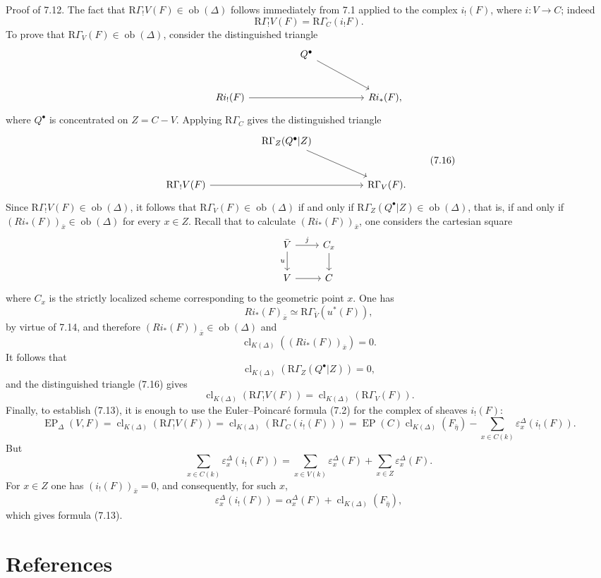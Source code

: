 \documentclass[11pt]{article}
\providecommand{\EP}{\operatorname{EP}}
\providecommand{\Ob}{\operatorname{ob}}
\providecommand{\Ob}{\operatorname{ob}}
\providecommand{\EP}{\operatorname{EP}}
\providecommand{\Ob}{\operatorname{Ob}}
\providecommand{\clK}[1]{\operatorname{cl}_{K(#1)}}
\providecommand{\RG}{\mathrm R\Gamma}
\begin{document}
Proof of 7.12. The fact that $\RG_!V(F)\in\Ob(\Delta)$ follows immediately from 7.1 applied to the complex $i_!(F)$, where $i:V\to C$; indeed
\[
\RG_!V(F)=\RG_C(i_!F).
\]
To prove that $\RG_V(F)\in\Ob(\Delta)$, consider the distinguished triangle
\[
\begin{tikzcd}[column sep=huge,row sep=large]
& Q^\bullet \arrow[dr] &\\
Ri_!(F) \arrow[rr] && Ri_*(F),
\end{tikzcd}
\]
where $Q^\bullet$ is concentrated on $Z=C-V$. Applying $\RG_C$ gives the distinguished triangle
\[
\begin{tikzcd}[column sep=huge,row sep=large]
& \RG_Z(Q^\bullet|Z) \arrow[dr] &\\
\RG_!V(F) \arrow[rr] && \RG_V(F).
\end{tikzcd}
\tag{7.16}
\]
Since $\RG_!V(F)\in\Ob(\Delta)$, it follows that $\RG_V(F)\in\Ob(\Delta)$ if and only if $\RG_Z(Q^\bullet|Z)\in\Ob(\Delta)$, that is, if and only if $(Ri_*(F))_{\bar x}\in\Ob(\Delta)$ for every $x\in Z$. Recall that to calculate $(Ri_*(F))_{\bar x}$, one considers the cartesian square
\[
\begin{tikzcd}
\bar V \arrow[r,"j"] \arrow[d,"u"'] & C_x \arrow[d]\\
V \arrow[r] & C
\end{tikzcd}
\]
where $C_x$ is the strictly localized scheme corresponding to the geometric point $x$. One has
\[
Ri_*(F)_{\bar x}\simeq \RG_{\bar V}(u^*(F)),
\]
by virtue of 7.14, and therefore $(Ri_*(F))_{\bar x}\in\Ob(\Delta)$ and
\[
\clK{\Delta}((Ri_*(F))_{\bar x})=0.
\]
It follows that
\[
\clK{\Delta}(\RG_Z(Q^\bullet|Z))=0,
\]
and the distinguished triangle (7.16) gives
\[
\clK{\Delta}(\RG_!V(F))=\clK{\Delta}(\RG_V(F)).
\]
Finally, to establish (7.13), it is enough to use the Euler--Poincaré formula (7.2) for the complex of sheaves $i_!(F)$:
\[
\EP_\Delta(V,F)
=
\clK{\Delta}(\RG_!V(F))
=
\clK{\Delta}(\RG_C(i_!(F)))
=
\EP(C)\clK{\Delta}(F_{\bar\eta})
-\sum_{x\in C(k)}\varepsilon_x^\Delta(i_!(F)).
\]
But
\[
\sum_{x\in C(k)}\varepsilon_x^\Delta(i_!(F))
=
\sum_{x\in V(k)}\varepsilon_x^\Delta(F)
+\sum_{x\in Z}\varepsilon_x^\Delta(F).
\]
For $x\in Z$ one has $(i_!(F))_{\bar x}=0$, and consequently, for such $x$,
\[
\varepsilon_x^\Delta(i_!(F))
=
\alpha_x^\Delta(F)+\clK{\Delta}(F_{\bar\eta}),
\]
which gives formula (7.13).

\section*{References}
\end{document}
